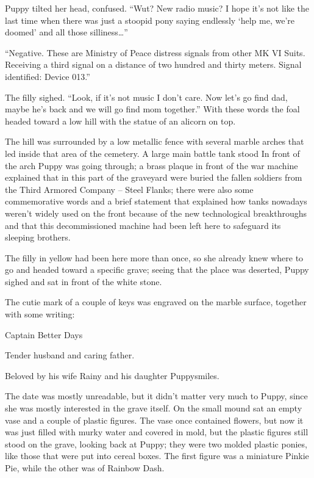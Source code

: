 Puppy tilted her head, confused. ``Wut? New radio music? I hope it's not like the last time when there was just a stoopid pony saying endlessly `help me, we're doomed' and all those silliness\dots''

``{\mt Negative. These are Ministry of Peace distress signals from other MK VI Suits. Receiving a third signal on a distance of two hundred and thirty meters. Signal identified: Device 013.}''

The filly sighed. ``Look, if it's not music I don't care. Now let's go find dad, maybe he's back and we will go find mom together.'' With these words the foal headed toward a low hill with the statue of an alicorn on top.

The hill was surrounded by a low metallic fence with several marble arches that led inside that area of the cemetery. A large main battle tank stood In front of the arch Puppy was going through; a brass plaque in front of the war machine explained that in this part of the graveyard were buried the fallen soldiers from the Third Armored Company -- Steel Flanks; there were also some commemorative words and a brief statement that explained how tanks nowadays weren't widely used on the front because of the new technological breakthroughs and that this decommissioned machine had been left here to safeguard its sleeping brothers.

The filly in yellow had been here more than once, so she already knew where to go and headed toward a specific grave; seeing that the place was deserted, Puppy sighed and sat in front of the white stone.

The cutie mark of a couple of keys was engraved on the marble surface, together with some writing:

\begin{center}
    Captain Better Days
    
    Tender husband and caring father.
    
    Beloved by his wife Rainy and his daughter Puppysmiles.
\end{center}

The date was mostly unreadable, but it didn't matter very much to Puppy, since she was mostly interested in the grave itself. On the small mound sat an empty vase and a couple of plastic figures. The vase once contained flowers, but now it was just filled with murky water and covered in mold, but the plastic figures still stood on the grave, looking back at Puppy; they were two molded plastic ponies, like those that were put into cereal boxes. The first figure was a miniature Pinkie Pie, while the other was of Rainbow Dash.

